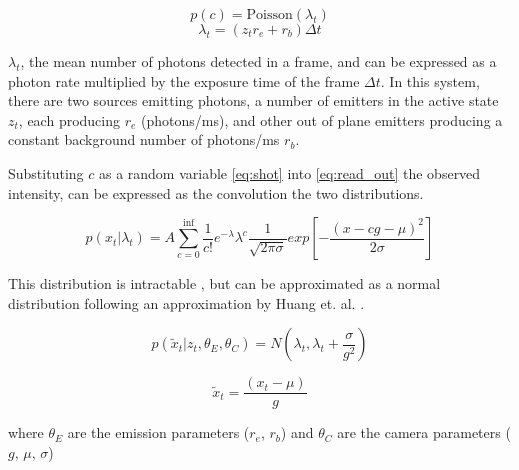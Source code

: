  \begin{equation}
    p(c) = \text{Poisson}(\lambda_{t})
    \label{eq:shot}
  \end{equation}
  \begin{equation*}
    \lambda_{t} = (z_{t}r_e + r_{b}) \Delta t
  \end{equation*}

  $\lambda_{t}$, the mean number of photons detected in a frame, and
    can be expressed as a photon rate multiplied by the exposure time of the frame $\Delta t$.
    In this system, there are two sources emitting photons, a number of emitters in the active state $z_t$, each producing $r_e$ (photons/ms), and 
    other out of plane emitters producing a constant background number of photons/ms $r_b$.

Substituting $c$ as a random variable \eqref{eq:shot} into \eqref{eq:read_out} 
  the observed intensity, can be expressed as the convolution the two distributions.

  \begin{equation*}
    p(x_{t}| \lambda_{t}) = A \sum_{c=0}^{\text{inf}}\frac{1}{c!} e^{-\lambda} \lambda^{c}
    \frac{1}{\sqrt{2\pi\sigma}}
    exp \left[ - \frac{(x - cg - \mu)^2}{2\sigma}\right]
  \end{equation*}

  This distribution is intractable , but can be approximated as a normal distribution 
  following an approximation by Huang et. al. \cite{huang_video-rate_2013}.

  \begin{equation}
    p(\tilde{x}_{t}| z_{t}, \theta_{E}, \theta_{C}) = N \left(\lambda_{t}, \lambda_{t} + \frac{\sigma}{g^{2}} \right)
    \label{eq:method:intensity_distribution}
  \end{equation}
  
  \begin{equation*}
    \tilde{x}_{t} = \frac{(x_{t} - \mu)}{g}
  \end{equation*}

  where $\theta_{E}$ are the emission parameters ($r_{e}$, $r_{b}$) and 
  $\theta_{C}$ are the camera parameters ($g$, $\mu$, $\sigma$)

